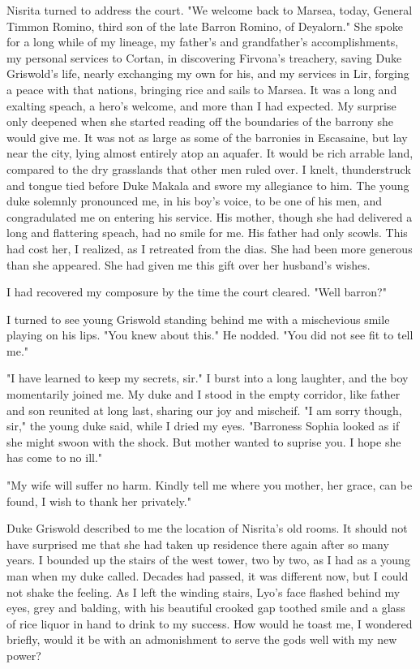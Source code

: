 \documentclass{article}
\begin{document}
Nisrita turned to address the court. "We welcome back to Marsea, today, General Timmon Romino, third son of the late Barron Romino, of Deyalorn." She spoke for a long while of my lineage, my father's and grandfather's accomplishments, my personal services to Cortan, in discovering Firvona's treachery, saving Duke Griswold's life, nearly exchanging my own for his, and my services in Lir, forging a peace with that nations, bringing rice and sails to Marsea. It was a long and exalting speach, a hero's welcome, and more than I had expected. My surprise only deepened when she started reading off the boundaries of the barrony she would give me. It was not as large as some of the barronies in Escasaine, but lay near the city, lying almost entirely atop an aquafer. It would be rich arrable land, compared to the dry grasslands that other men ruled over. I knelt, thunderstruck and tongue tied before Duke Makala and swore my allegiance to him. The young duke solemnly pronounced me, in his boy's voice, to be  one of his men, and congradulated me on entering his service. His mother, though she had delivered a long and flattering speach, had no smile for me. His father had only scowls. This had cost her, I realized, as I retreated from the dias. She had been more generous than she appeared. She had given me this gift over her husband's wishes.

I had recovered my composure by the time the court cleared. "Well barron?"

I turned to see young Griswold standing behind me with a mischevious smile playing on his lips. "You knew about this." He nodded. "You did not see fit to tell me."

"I have learned to keep my secrets, sir." I burst into a long laughter, and the boy momentarily joined me. My duke and I stood in the empty corridor, like father and son reunited at long last, sharing our joy and mischeif. "I am sorry though, sir," the young duke said, while I dried my eyes. "Barroness Sophia looked as if she might swoon with the shock. But mother wanted to suprise you. I hope she has come to no ill."

"My wife will suffer no harm. Kindly tell me where you mother, her grace, can be found, I wish to thank her privately." 

Duke Griswold described to me the location of Nisrita's old rooms. It should not have surprised me that she had taken up residence there again after so many years. I bounded up the stairs of the west tower, two by two, as I had as a young man when my duke called. Decades had passed, it was different now, but I could not shake the feeling. As I left the winding stairs, Lyo's face flashed behind my eyes, grey and balding, with his beautiful crooked gap toothed smile and a glass of rice liquor in hand to drink to my success. How would he toast me, I wondered briefly, would it be with an admonishment to serve the gods well with my new power? 
\end{document}
